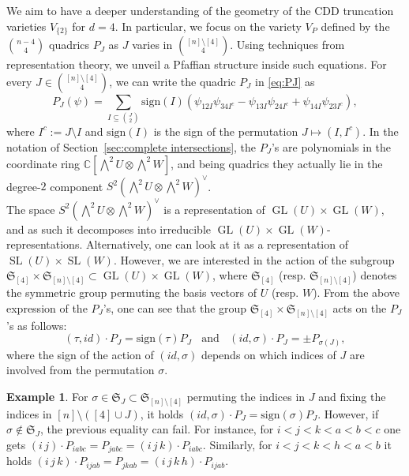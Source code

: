 \documentclass[11pt,reqno]{amsart}
\theoremstyle{definition}
\newtheorem{example}[theorem]{Example}
\numberwithin{theorem}{section}
\newcommand{\sign}{\mathrm{sign}}
\DeclareMathOperator{\GL}{GL}
\DeclareMathOperator{\SL}{SL}
\numberwithin{equation}{section}
\begin{document}
We aim to have a deeper understanding of the geometry of the CDD truncation varieties $V_{\{2\}}$ for $d=4$. In particular, we focus on the variety $V_P$ defined by the $\binom{n-4}{4}$ quadrics $P_J$ as $J $ varies in $\binom{[n]\setminus[4]}{4}$. Using techniques from representation theory, we unveil a Pfaffian structure inside such equations. For every $J \in \binom{[n] \setminus [4]}{4}$, we can write the quadric $P_J$ in \eqref{eq:PJ} as
\[
P_J(\psi) = \sum_{I \subseteq \binom{J}{2}} \sign(I)(\psi_{12I}\psi_{34I^c} - \psi_{13I}\psi_{24I^c} + \psi_{14I}\psi_{23I^c}),
\]
where $I^c := J\setminus I$ and $\sign(I)$ is the sign of the permutation $J \mapsto (I, I^c)$. In the notation of Section~\ref{sec:complete intersections}, the $P_J$'s are polynomials in the coordinate ring $\mathbb C[\bigwedge^2U \otimes \bigwedge^2W]$, and being quadrics they actually lie in the degree-$2$ component $S^2(\bigwedge^2U \otimes \bigwedge^2W)^\vee$. \\
\hfill\break
\indent The space $S^2(\bigwedge^2U \otimes \bigwedge^2W)^\vee$ is a representation of $\GL(U)\times \GL(W)$, and as such it decomposes into irreducible $\GL(U)\times \GL(W)$-representations. Alternatively, one can look at it as a representation of $\SL(U)\times \SL(W)$. However, we are interested in the action of the subgroup $\mathfrak{S}_{[4]}\times \mathfrak{S}_{[n] \setminus [4]} \subset \GL(U)\times \GL(W)$, where $\mathfrak{S}_{[4]}$ (resp. $\mathfrak{S}_{[n]\setminus [4]}$) denotes the symmetric group permuting the basis vectors of $U$ (resp. $W$). From the above expression of the $P_J$'s, one can see that the group $\mathfrak{S}_{[4]}\times \mathfrak{S}_{[n]\setminus [4]}$ acts on the $P_J$'s as follows:
\begin{equation}\label{eq:action of S4 on PJ}
(\tau,id) \cdot P_J = \sign(\tau)P_J \ \ \ \ \text{and} \ \ \ \ (id,\sigma) \cdot P_J = \pm P_{\sigma(J)}, 
\end{equation}
where the sign of the action of $(id,\sigma)$ depends on which indices of $J$ are involved from the permutation $\sigma$. 

\begin{example}\label{example:action of SJ on PJ}
For $\sigma \in \mathfrak{S}_{J}\subset \mathfrak{S}_{[n]\setminus [4]}$ permuting the indices in $J$ and fixing the indices in $[n]\setminus ([4]\cup J)$, it holds $(id, \sigma)\cdot P_J = \sign(\sigma)P_J$. However, if $\sigma \notin \mathfrak{S}_J$, the previous equality can fail. For instance, for $i< j < k < a <b <c$ one gets
$(i \, j)\cdot P_{iabc} = P_{jabc} = (i \, j \, k)\cdot P_{iabc}$. Similarly, for $i<j<k<h<a<b$ it holds $(i \, j \, k) \cdot P_{ijab} = P_{jkab} = (i \, j \, k \, h) \cdot P_{ijab}$.
\end{example}
\end{document}
